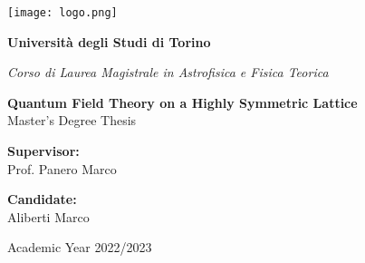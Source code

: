 \thispagestyle{empty}
\begin{center}
    \texttt{[image: logo.png]}
    \vspace{0.5cm}\\
    {\LARGE\bfseries Università degli Studi di Torino \par}
	\vspace{0,3cm}
	{\Large\it Corso di Laurea Magistrale in Astrofisica e Fisica Teorica\par}
    \vspace{2cm}
	{\LARGE\bfseries Quantum Field Theory on a Highly Symmetric Lattice}
	\vspace{0.3cm}\\
    {\Large Master's Degree Thesis}
	\vspace{0,5cm}
\end{center}
\vspace{2cm}
\begin{minipage}[t]{0.4\textwidth} %
    {\large{{\bf Supervisor:}\\
        Prof. Panero Marco}}
\end{minipage}
\hfill
\begin{minipage}[t]{0.47\textwidth}\raggedleft %
    {\large{{\bf Candidate:}\\
        Aliberti Marco}}
    \vspace{12mm}
\end{minipage}
\hfill
\vspace{18mm}
\begin{center} %
    \large{Academic Year 2022/2023}
\end{center} 
